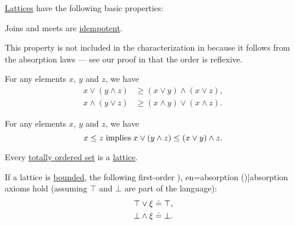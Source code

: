\begin{proposition}\label{thm:def:lattice}
  \hyperref[def:lattice]{Lattices} have the following basic properties:
  \begin{thmenum}
     Joins and meets are \hyperref[def:binary_operation/idempotent]{idempotent}.

    This property is not included in the characterization in  because it follows from the absorption laws --- see our proof in  that the order is reflexive.

     For any elements \( x \), \( y \) and \( z \), we have
    \begin{subequations}
      \begin{align}
        x \vee (y \wedge z) &\geq (x \vee y) \wedge (x \vee z), \label{eq:thm:def:lattice/distributive_inequality/join_over_meet} \\
        x \wedge (y \vee z) &\geq (x \wedge y) \vee (x \wedge z). \label{eq:thm:def:lattice/distributive_inequality/meet_over_join}
      \end{align}
    \end{subequations}

     For any elements \( x \), \( y \) and \( z \), we have
    \begin{equation}\label{eq:thm:def:lattice/modular_inequality}
      x \leq z \T{implies} x \vee (y \wedge z) \leq (x \vee y) \wedge z.
    \end{equation}

     Every \hyperref[def:totally_ordered_set]{totally ordered set} is a \hyperref[def:lattice]{lattice}.

     If a lattice is \hyperref[def:extremal_points/bounds]{bounded}, the following first-order \term[ru=поглощение (\cite[6]{Гуров2013}), en=absorption (\cite[8]{Birkhoff1967})]{absorption} axioms hold (assuming \( \top \) and \( \bot \) are part of the language):
    \begin{subequations}
      \begin{align}
        \top \vee \xi \doteq \top \label{eq:thm:def:lattice/bounded_absorption/join}, \\
        \bot \wedge \xi \doteq \bot \label{eq:thm:def:lattice/bounded_absorption/meet}.
      \end{align}
    \end{subequations}


\end{thmenum}
\end{proposition}
